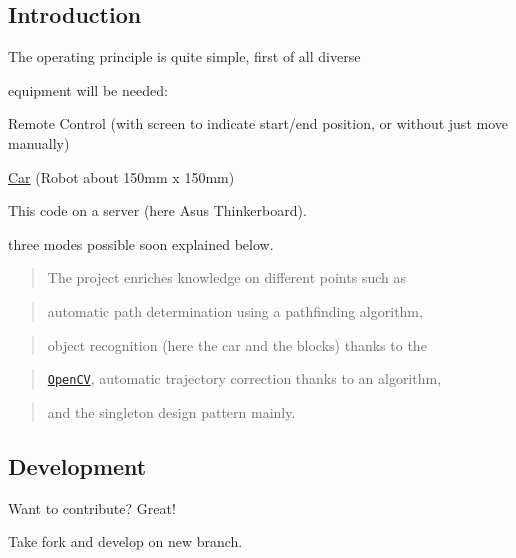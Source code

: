 \subsection*{Introduction}

The operating principle is quite simple, first of all diverse

equipment will be needed\-:


\begin{DoxyItemize}
\item Remote Control (with screen to indicate start/end position, or without just move manually)
\item \hyperlink{class_car}{Car} (Robot about 150mm x 150mm)
\item This code on a server (here Asus Thinkerboard).
\end{DoxyItemize}

three modes possible soon explained below.

\begin{quotation}
The project enriches knowledge on different points such as

\end{quotation}


\begin{quotation}
automatic path determination using a pathfinding algorithm,

\end{quotation}


\begin{quotation}
object recognition (here the car and the blocks) thanks to the

\end{quotation}


\begin{quotation}
\href{https://opencv.org/}{\tt Open\-C\-V}, automatic trajectory correction thanks to an algorithm,

\end{quotation}


\begin{quotation}
and the singleton design pattern mainly.

\end{quotation}




\subsection*{Development}

Want to contribute? Great!

Take fork and develop on new branch. 